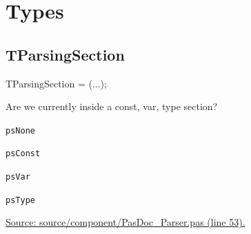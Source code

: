 \documentclass{report}
\newif\ifpdf
\begin{document}
\section{Types}
\ifpdf
\subsection*{\large{\textbf{TParsingSection}}\normalsize\hspace{1ex}\hrulefill}
\else
\subsection*{TParsingSection}
\fi
\label{PasDoc_Parser-TParsingSection}
\begin{list}{}{
\setlength{\itemindent}{0cm}
\setlength{\listparindent}{0cm}
\setlength{\leftmargin}{\evensidemargin}
\addtolength{\leftmargin}{\tmplength}
\settowidth{\labelsep}{X}
\addtolength{\leftmargin}{\labelsep}
\setlength{\labelwidth}{\tmplength}
}
\item[\textbf{Declaration}\hfill]
\ifpdf
\begin{flushleft}
\fi
\begin{ttfamily}
TParsingSection = (...);\end{ttfamily}

\ifpdf
\end{flushleft}
\fi

\par
\item[\textbf{Description}]
Are we currently inside a const, var, type section?\item[\textbf{Values}]
\begin{description}
\item[\texttt{psNone}] \label{PasDoc_Parser-psNone}
\index{}
 
\item[\texttt{psConst}] \label{PasDoc_Parser-psConst}
\index{}
 
\item[\texttt{psVar}] \label{PasDoc_Parser-psVar}
\index{}
 
\item[\texttt{psType}] \label{PasDoc_Parser-psType}
\index{}
 
\end{description}
\par
\href{https://github.com/pasdoc/pasdoc/blob/master/source/component/PasDoc_Parser.pas#L53}{Source: source/component/PasDoc{\_}Parser.pas (line 53).}

\end{list}
\end{document}
